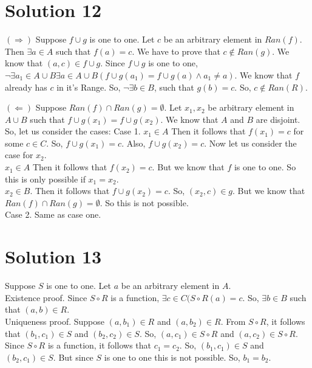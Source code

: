 \documentclass{article}
\begin{document}
\section{Solution 12}
$(\Rightarrow)$ Suppose $f \cup g$ is one to one. Let $c$ be an
arbitrary element in $Ran(f)$. Then $\exists a \in A$ such that $f(a)
= c$. We have to prove that $c \notin Ran(g)$. We know that $(a,c) \in
f \cup g$. Since $f \cup g$ is one to one, $\neg \exists a_1 \in A \cup B \exists
a \in A \cup B(f \cup g(a_1) = f \cup g(a) \land a_1 \neq a)$. We know
that $f$ already has $c$ in it's Range. So, $\neg \exists b \in B$,
such that $g(b) = c$. So, $c \notin Ran(R)$.

$(\Leftarrow)$ Suppose $Ran(f) \cap Ran(g) = \emptyset$. Let $x_1,
x_2$ be arbitrary element in $A \cup B$ such that $f \cup g(x_1) = f
\cup g(x_2)$. We know that $A$ and $B$ are disjoint. So, let us
consider the cases:
Case 1. $x_1 \in A$ Then it follows that $f(x_1) = c$ for some $c \in
C$. So, $f \cup g(x_1) = c$. Also, $f \cup g(x_2) = c$. Now let us
consider the case for $x_2$. \\
$x_1 \in A$ Then it follows that $f(x_2) = c$. But we know that $f$ is
one to one. So this is only possible if $x_1 = x_2$. \\
$x_2 \in B$. Then it follows that $f \cup g(x_2) = c$. So, $(x_2, c)
\in g$. But we know that $Ran(f) \cap Ran(g) = \emptyset$. So this is
not possible. \\
Case 2. Same as case one.

\section{Solution 13}
Suppose $S$ is one to one. Let $a$ be an arbitrary element in $A$. \\
Existence proof. Since $S \circ R$ is a function, $\exists c \in C (S
\circ R(a) = c$. So, $\exists b \in B$ such that $(a,b) \in R$. \\
Uniqueness proof. Suppose $(a,b_1) \in R$ and $(a,b_2) \in R$. From $S
\circ R$, it follows that $(b_1, c_1) \in S$ and $(b_2, c_2) \in S$.
So, $(a,c_1) \in S \circ R$ and $(a,c_2) \in S \circ R$. Since $S
\circ R$ is a function, it follows that $c_1 = c_2$. So, $(b_1, c_1)
\in S$ and $(b_2, c_1) \in S$. But since $S$ is one to one this is not
possible. So, $b_1 = b_2$.
\end{document}
